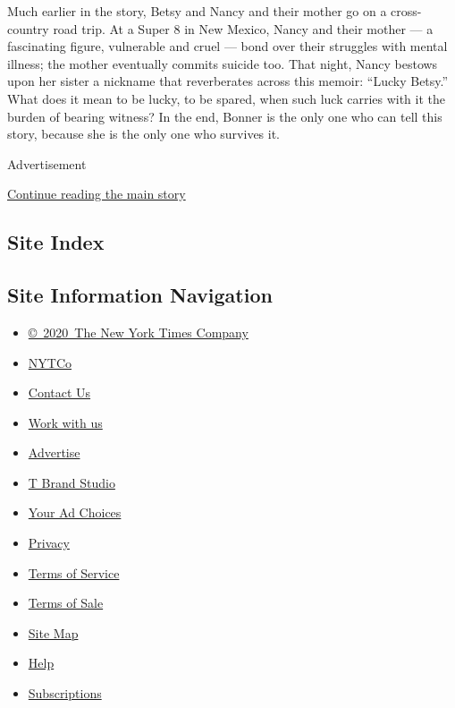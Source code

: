 Much earlier in the story, Betsy and Nancy and their mother go on a
cross-country road trip. At a Super 8 in New Mexico, Nancy and their
mother --- a fascinating figure, vulnerable and cruel --- bond over
their struggles with mental illness; the mother eventually commits
suicide too. That night, Nancy bestows upon her sister a nickname that
reverberates across this memoir: ``Lucky Betsy.'' What does it mean to
be lucky, to be spared, when such luck carries with it the burden of
bearing witness? In the end, Bonner is the only one who can tell this
story, because she is the only one who survives it.

Advertisement

\protect\hyperlink{after-bottom}{Continue reading the main story}

\hypertarget{site-index}{%
\subsection{Site Index}\label{site-index}}

\hypertarget{site-information-navigation}{%
\subsection{Site Information
Navigation}\label{site-information-navigation}}

\begin{itemize}
\tightlist
\item
  \href{https://help.nytimes3xbfgragh.onion/hc/en-us/articles/115014792127-Copyright-notice}{©~2020~The
  New York Times Company}
\end{itemize}

\begin{itemize}
\tightlist
\item
  \href{https://www.nytco.com/}{NYTCo}
\item
  \href{https://help.nytimes3xbfgragh.onion/hc/en-us/articles/115015385887-Contact-Us}{Contact
  Us}
\item
  \href{https://www.nytco.com/careers/}{Work with us}
\item
  \href{https://nytmediakit.com/}{Advertise}
\item
  \href{http://www.tbrandstudio.com/}{T Brand Studio}
\item
  \href{https://www.nytimes3xbfgragh.onion/privacy/cookie-policy\#how-do-i-manage-trackers}{Your
  Ad Choices}
\item
  \href{https://www.nytimes3xbfgragh.onion/privacy}{Privacy}
\item
  \href{https://help.nytimes3xbfgragh.onion/hc/en-us/articles/115014893428-Terms-of-service}{Terms
  of Service}
\item
  \href{https://help.nytimes3xbfgragh.onion/hc/en-us/articles/115014893968-Terms-of-sale}{Terms
  of Sale}
\item
  \href{https://spiderbites.nytimes3xbfgragh.onion}{Site Map}
\item
  \href{https://help.nytimes3xbfgragh.onion/hc/en-us}{Help}
\item
  \href{https://www.nytimes3xbfgragh.onion/subscription?campaignId=37WXW}{Subscriptions}
\end{itemize}

